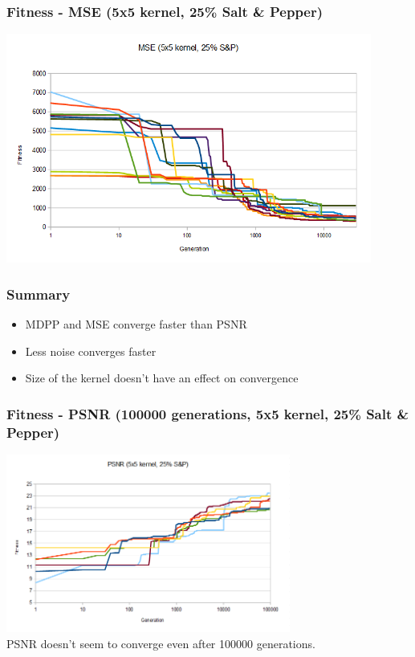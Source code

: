\documentclass{beamer}
\begin{document}
	\begin{frame}[t,fragile]
	\frametitle{Fitness - MSE (5x5 kernel, 25\% Salt \& Pepper)}					
	\begin{center}
	\includegraphics[width=0.9\textwidth]{img/mse_5x5_25sp.png}
	
	\end{center}
	\end{frame}
	
	
	\begin{frame}[t,fragile]
	\frametitle{Summary}	
				
	\begin{itemize}
		\item MDPP and MSE converge faster than PSNR
		\item Less noise converges faster
		\item Size of the kernel doesn't have an effect on convergence
	\end{itemize}				
						
	\end{frame}	
	
		\begin{frame}[t,fragile]
	\frametitle{Fitness - PSNR (100000 generations, 5x5 kernel, 25\% Salt \& Pepper)}					
	\begin{center}
	\includegraphics[width=0.7\textwidth]{img/psnr_5x5_25sp_100000.png} \\
	PSNR doesn't seem to converge even after 100000 generations.
	
	\end{center}
	\end{frame}		
	
\end{document}
